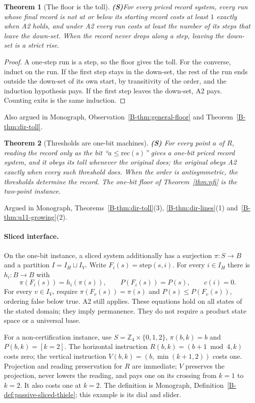 \documentclass[11pt, a4paper]{report}
\theoremstyle{definition}
\theoremstyle{plain}
\newtheorem{theorem}{Theorem}[chapter]
\newcommand{\cost}{c}
\newcommand{\cert}{P}
\begin{document}
\begin{theorem}[The floor is the toll] \textbf{(S)}\label{thm:floor-toll}
For every priced record system, every run whose final record is not at or below its
starting record costs at least $1$ exactly when A2 holds, and under A2 every run costs at least the
number of its steps that leave the down-set.
When the record never drops along a step, leaving the down-set is a strict
rise.
\end{theorem}
\begin{proof}
A one-step run is a step, so the floor gives the toll. For the converse,
induct on the run. If the first step stays in the down-set, the rest of the
run ends outside the down-set of its own start, by transitivity of the order,
and the induction hypothesis pays. If the first step leaves the down-set, A2
pays. Counting exits is the same induction.
\end{proof}
\noindent Also argued in Monograph, Observation~\ref{B-thm:general-floor} and
Theorem~\ref{B-thm:dir-toll}.

\begin{theorem}[Thresholds are one-bit machines] \textbf{(S)}
For every point $a$ of $R$, reading the record only as the bit
``$a \le \mathrm{rec}(s)$'' gives a one-bit priced record system, and it obeys its
toll whenever the original does; the original obeys A2
exactly when every such threshold does. When the
order is antisymmetric, the thresholds determine the record. The one-bit floor of
Theorem~\ref{thm:nfi} is the two-point instance.
\end{theorem}
\noindent Argued in Monograph, Theorems~\ref{B-thm:dir-toll}(3), \ref{B-thm:dir-lines}(1)
and~\ref{B-thm:u11-growing}(2).

\paragraph{Sliced interface.}
On the one-bit instance, a sliced system additionally has a surjection $\pi:S\to B$ and a partition
$I=I_H\sqcup I_V$. Write $F_i(s)=\mathrm{step}(s,i)$. For every $i\in I_H$ there
is $h_i:B\to B$ with
\[
\pi(F_i(s))=h_i(\pi(s)),\qquad \cert(F_i(s))=\cert(s),\qquad \cost(i)=0.
\]
For every $v\in I_V$, require $\pi(F_v(s))=\pi(s)$ and
$\cert(s)\le\cert(F_v(s))$, ordering false below true. A2 still applies.
These equations hold on all states of the stated domain; they imply permanence.
They do not require a product state space or a universal base.

For a non-certification instance, use $S=\mathbb Z_4\times\{0,1,2\}$,
$\pi(b,k)=b$ and $\cert(b,k)=[k=2]$. The horizontal instruction
$R(b,k)=(b+1\bmod4,k)$ costs zero; the vertical instruction
$V(b,k)=(b,\min(k+1,2))$ costs one. Projection and reading preservation for $R$
are immediate; $V$ preserves the projection, never lowers the reading, and pays
one on its crossing from $k=1$ to $k=2$. It also costs one at $k=2$.
The definition is Monograph, Definition~\ref{B-def:passive-sliced-thiele}; this example is its
dial and slider.
\end{document}
